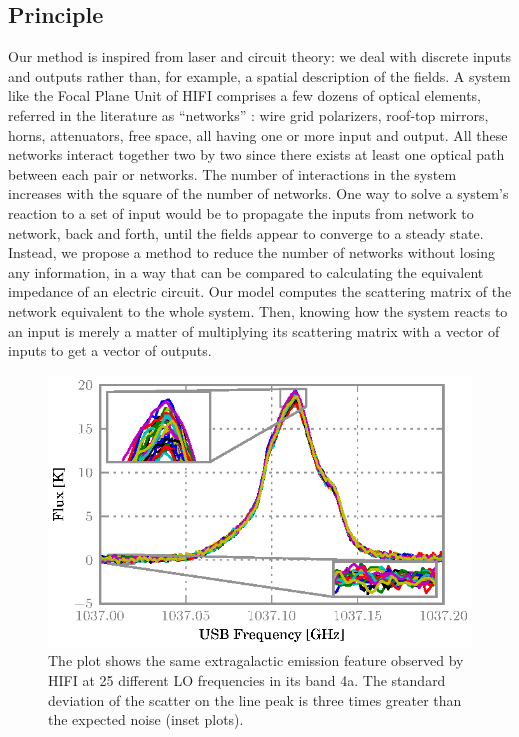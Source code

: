 \documentclass[journal]{IEEEtran}
\begin{document}
\subsection{Principle}
Our method is inspired from laser and circuit theory: we deal with discrete inputs and outputs rather than, for example, a spatial description of the fields.
A system like the Focal Plane Unit of HIFI comprises a few dozens of optical elements, referred in the literature as ``networks'' \cite{siegman1986lasers}: wire grid polarizers, roof-top mirrors, horns, attenuators, free space, all having one or more input and output.
All these networks interact together two by two since there exists at least one optical path between each pair or networks.
The number of interactions in the system increases with the square of the number of networks.
One way to solve a system's reaction to a set of input would be to propagate the inputs from network to network, back and forth, until the fields appear to converge to a steady state.
Instead, we propose a method to reduce the number of networks without losing any information, in a way that can be compared to calculating the equivalent impedance of an electric circuit.
Our model computes the scattering matrix of the network equivalent to the whole system.
Then, knowing how the system reacts to an input is merely a matter of multiplying its scattering matrix with a vector of inputs to get a vector of outputs.

\begin{figure}
    \centering
    \includegraphics{obsid_5000352C}
    \caption{
    The plot shows the same extragalactic emission feature observed by HIFI at 25 different LO frequencies in its band 4a.
    The standard deviation of the scatter on the line peak is three times greater than the expected noise (inset plots).
    }%
    \label{fig:scatter_real_data}
\end{figure}
\end{document}
